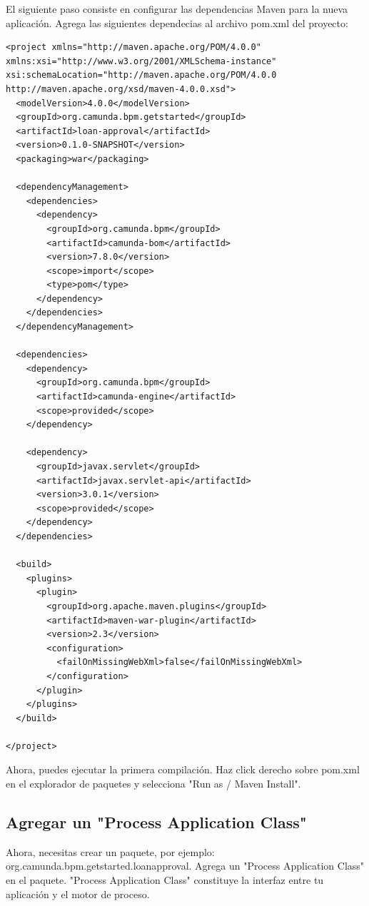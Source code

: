 \documentclass{article}
\begin{document}
El siguiente paso consiste en configurar las dependencias Maven para la nueva aplicación. Agrega las siguientes dependecias al archivo pom.xml del proyecto:

\begin{verbatim}
<project xmlns="http://maven.apache.org/POM/4.0.0" 
xmlns:xsi="http://www.w3.org/2001/XMLSchema-instance"
xsi:schemaLocation="http://maven.apache.org/POM/4.0.0 
http://maven.apache.org/xsd/maven-4.0.0.xsd">
  <modelVersion>4.0.0</modelVersion>
  <groupId>org.camunda.bpm.getstarted</groupId>
  <artifactId>loan-approval</artifactId>
  <version>0.1.0-SNAPSHOT</version>
  <packaging>war</packaging>

  <dependencyManagement>
    <dependencies>
      <dependency>
        <groupId>org.camunda.bpm</groupId>
        <artifactId>camunda-bom</artifactId>
        <version>7.8.0</version>
        <scope>import</scope>
        <type>pom</type>
      </dependency>
    </dependencies>
  </dependencyManagement>

  <dependencies>
    <dependency>
      <groupId>org.camunda.bpm</groupId>
      <artifactId>camunda-engine</artifactId>
      <scope>provided</scope>
    </dependency>

    <dependency>
      <groupId>javax.servlet</groupId>
      <artifactId>javax.servlet-api</artifactId>
      <version>3.0.1</version>
      <scope>provided</scope>
    </dependency>
  </dependencies>

  <build>
    <plugins>
      <plugin>
        <groupId>org.apache.maven.plugins</groupId>
        <artifactId>maven-war-plugin</artifactId>
        <version>2.3</version>
        <configuration>
          <failOnMissingWebXml>false</failOnMissingWebXml>
        </configuration>
      </plugin>
    </plugins>
  </build>

</project>
\end{verbatim}

Ahora, puedes ejecutar la primera compilación. Haz click derecho sobre pom.xml en el explorador de paquetes y selecciona "Run as / Maven Install".

\subsection{Agregar un "Process Application Class"}

Ahora, necesitas crear un paquete, por ejemplo:\\
org.camunda.bpm.getstarted.loanapproval. Agrega un "Process Application Class" en el paquete. "Process Application Class" constituye la interfaz entre tu aplicación y el motor de proceso.
\end{document}
